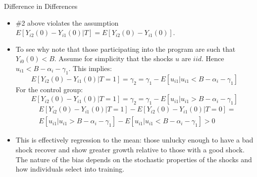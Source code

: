 \begin{frame}{Difference in Differences}
\small
\begin{itemize}
\item  \#2 above violates the assumption {\small $E[Y_{i2}(0) - Y_{i1}(0) | T] = E[Y_{i2}(0) - Y_{i1}(0)]$}. 
\item To see why note that those participating into the program are such
that {\small $Y_{i0}(0) < B$}. Assume for simplicity that the shocks {\small $u$} are {\small $iid$}. Hence {\small $u_{i1} < B- \alpha_i - \gamma_1$}. 
This implies: 
{\small $$E[Y_{i2}(0)- Y_{i1}(0) | T=1] = \gamma_2 = \gamma_1 - E[u_{i1}| u_{i1} <  B-\alpha_i - \gamma_1]$$}
For the control group:
{\small $$E[Y_{i2}(0) - Y_{i1}(0) | T=1] = \gamma_2 = \gamma_1 - E[u_{i1}| u_{i1} >  B-\alpha_i - \gamma_1]$$}
\vspace{-1cm}
\begin{align*}
& E[Y_{i2}(0) - Y_{i1}(0) | T=1] - E[Y_{i2}(0) - Y_{i1}(0) | T=0] =\\
&  E[u_{i1} | u_{i1} >  B-\alpha_i - \gamma_1] - E[u_{i1} | u_{i1} < B-\alpha_i - \gamma_1]  >0
  \end{align*}
 \item This is effectively regression to the mean: those unlucky enough to have a bad shock recover and show greater growth relative to those with a good shock. The nature of the bias depends on the stochastic properties of the shocks and how individuals select into training.
\end{itemize}
\end{frame} 

%

